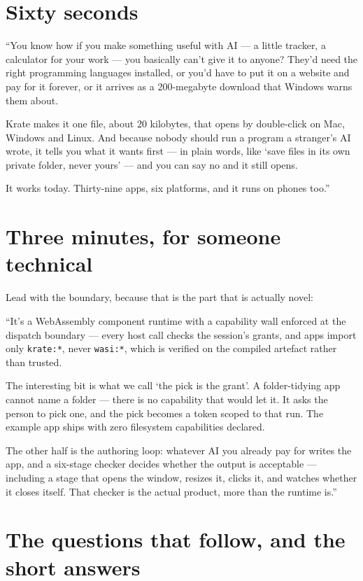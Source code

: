 \documentclass[11pt,a4paper]{report}
\begin{document}
\section{Sixty seconds}

``You know how if you make something useful with AI --- a little tracker, a
calculator for your work --- you basically can't give it to anyone? They'd
need the right programming languages installed, or you'd have to put it on
a website and pay for it forever, or it arrives as a 200-megabyte download
that Windows warns them about.

Krate makes it one file, about 20 kilobytes, that opens by double-click on
Mac, Windows and Linux. And because nobody should run a program a
stranger's AI wrote, it tells you what it wants first --- in plain words,
like `save files in its own private folder, never yours' --- and you can
say no and it still opens.

It works today. Thirty-nine apps, six platforms, and it runs on phones
too.''

\section{Three minutes, for someone technical}

Lead with the boundary, because that is the part that is actually novel:

``It's a WebAssembly component runtime with a capability wall enforced at
the dispatch boundary --- every host call checks the session's grants, and
apps import only \texttt{krate:*}, never \texttt{wasi:*}, which is verified
on the compiled artefact rather than trusted.

The interesting bit is what we call `the pick is the grant'. A
folder-tidying app cannot name a folder --- there is no capability that
would let it. It asks the person to pick one, and the pick becomes a
token scoped to that run. The example app ships with zero filesystem
capabilities declared.

The other half is the authoring loop: whatever AI you already pay for
writes the app, and a six-stage checker decides whether the output is
acceptable --- including a stage that opens the window, resizes it, clicks
it, and watches whether it closes itself. That checker is the actual
product, more than the runtime is.''

\section{The questions that follow, and the short answers}
\end{document}
